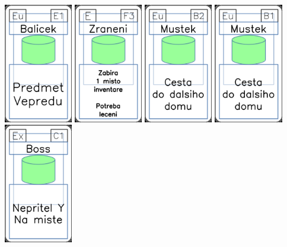 \documentclass[a4paper]{article}
\begin{document}
	\includegraphics[width=3.0cm]{img-4_20}
	\includegraphics[width=3.0cm]{img-4_57}
	\includegraphics[width=3.0cm]{img-4_36}
	\includegraphics[width=3.0cm]{img-4_35}
	\includegraphics[width=3.0cm]{img-4_10}
\end{document}

